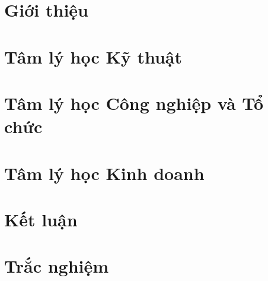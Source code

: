 \documentclass[presentation]{beamer}
\begin{document}
\section{Giới thiệu}


\section{Tâm lý học Kỹ thuật}





\section{Tâm lý học Công nghiệp và Tổ chức}





\section{Tâm lý học Kinh doanh}




\section{Kết luận}

\section{Trắc nghiệm}

\end{document}
